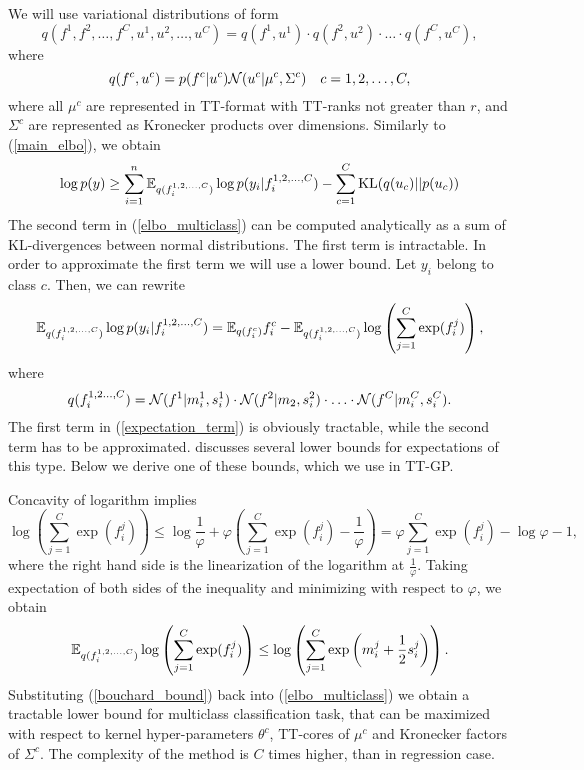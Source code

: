   We will use variational distributions of form
  \[
    q(f^1, f^2, \ldots, f^C, u^1, u^2, \ldots, u^C) = 
    q(f^1, u^1) \cdot q(f^2, u^2) \cdot \ldots \cdot q(f^C, u^C),
  \]
  where
  \[
    q(f^c, u^c) = p(f^c | u^c) \mathcal{N}(u^c | \mu^c, \Sigma^c)~~~c=1, 2, \ldots, C,
  \]
  where all $\mu^c$ are represented in TT-format with TT-ranks not greater than $r$,
  and $\Sigma^c$ are represented as Kronecker products over dimensions.
  Similarly to (\ref{main_elbo}), we obtain
  \begin{equation}
  \label{elbo_multiclass}
    \log p(y) \ge \sum_{i = 1}^n \mathbb{E}_{q(f_i^{1, 2, \ldots, C})} \log p(y_i | f_i^{1, 2, \ldots, C})
      - \sum_{c = 1}^{C} \mbox{KL}(q(u_c) || p(u_c))
  \end{equation}
  The second term in (\ref{elbo_multiclass}) can be computed analytically as 
  a sum of KL-divergences between normal distributions. The first term is
  intractable. In order to approximate the first term we will use a lower bound.
  Let $y_i$ belong to class $c$. Then, we can rewrite
  \begin{equation}
  \label{expectation_term}
    \mathbb{E}_{q(f_i^{1, 2, \ldots, C})} \log p(y_i | f_i^{1, 2, \ldots, C}) =
    \mathbb{E}_{q(f_i^c)} f_i^c - \mathbb{E}_{q(f_i^{1, 2, \ldots, C})}
    \log \left(\sum_{j=1}^C \exp (f_i^j) \right),
  \end{equation}
  where
  \[
    q(f_i^{1, 2\ldots, C}) = \mathcal{N}(f^1 | m_i^1, s_i^1)\cdot \mathcal{N}(f^2| m_2, s_i^2) \cdot \ldots 
    \cdot \mathcal{N}(f^C | m_i^C, s_i^C).
  \]
  The first term in (\ref{expectation_term}) is obviously tractable, while the 
  second term has to be approximated. \citet{bouchard2007} discusses several
  lower bounds for expectations of this type. Below we derive one of these bounds,
  which we use in TT-GP.

  Concavity of logarithm implies
  \[
    \log(\sum_{j=1}^{C} \exp(f_i^j)) \le \log \frac 1 \varphi + 
      \varphi \left(\sum_{j=1}^C \exp(f_i^j) - \frac 1 \varphi\right) = 
      \varphi \sum_{j=1}^C \exp(f_i^j) - \log \varphi - 1,
  \]
  where the right hand side is the linearization of the logarithm at $\frac 1 \varphi$.
  Taking expectation of both sides of the inequality and minimizing with respect
  to $\varphi$, we obtain
  \begin{equation}
  \label{bouchard_bound}
    \mathbb{E}_{q(f_i^{1, 2, \ldots, C})} \log\left(\sum_{j=1}^C \exp(f_i^j)\right) \le
    \log \left(\sum_{j=1}^C \exp\left(m_i^j + \frac 1 2 s_i^j\right) \right).
  \end{equation}
  Substituting (\ref{bouchard_bound}) back into (\ref{elbo_multiclass}) we obtain
  a tractable lower bound for multiclass classification task, that can be
  maximized with respect to kernel hyper-parameters $\theta^c$, TT-cores of 
  $\mu^c$ and Kronecker factors of $\Sigma^c$. The complexity of the method
  is $C$ times higher, than in regression case.

